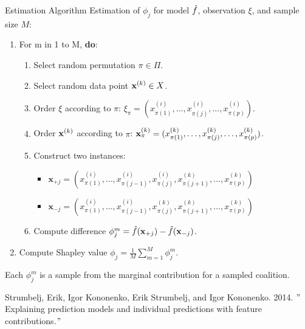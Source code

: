 \documentclass[11pt,compress,t,notes=noshow, aspectratio=169, xcolor=table]{beamer}
\begin{document}
\begin{vbframe}{Estimation Algorithm}
Estimation of $\phi_j$ for model $\fh$, observation $\xi$, and sample size $M$:
\vspace{0.25cm}
  \begin{enumerate}
      \item For m in 1 to M, \textbf{do}:
      \begin{enumerate}
        \item Select random permutation $\pi \in \Pi$.
        \item Select random data point $\xv^{(k)} \in X$.
        \item Order $\xi$ according to $\pi$: $\xi_{\pi} = (x^{(i)}_{\pi(1)}, \ldots, x^{(i)}_{\pi(j)}, \ldots, x^{(i)}_{\pi(p)})$.
        \item Order $\xk$ according to $\pi$: $\xk_{\pi} = (x^{(k)}_{\pi(1)}, \ldots, x^{(k)}_{\pi(j)}, \ldots, x^{(k)}_{\pi(p)})$.
        \item Construct two instances:
          \begin{itemize}
            \item $\mathbf{x}_{+j} = (x^{(i)}_{\pi(1)}, \ldots, x^{(i)}_{\pi(j - 1)}, x^{(i)}_{\pi(j)}, x^{(k)}_{\pi(j + 1)}, \ldots, x^{(k)}_{\pi(p)}) $
            \item $\mathbf{x}_{-j} = (x^{(i)}_{\pi(1)}, \ldots, x^{(i)}_{\pi(j - 1)}, x^{(k)}_{\pi(j)}, x^{(k)}_{\pi(j + 1)}, \ldots, x^{(k)}_{\pi(p)}) $
          \end{itemize}
        \item Compute difference $\phi_j^m = \fh(\mathbf{x}_{+j}) - \fh(\mathbf{x}_{-j})$.
      \end{enumerate}
    \item Compute Shapley value $\phi_j = \frac{1}{M}\sum_{m=1}^M \phi_j^m$.
  \end{enumerate}

  Each $\phi_j^m$ is a sample from the marginal contribution for a sampled coalition.

    \vspace{0.25cm}
    \tiny{Strumbelj, Erik, Igor Kononenko, Erik Strumbelj, and Igor Kononenko. 2014. $"$Explaining prediction models and individual predictions with feature contributions.$"$}

\end{vbframe}
\end{document}
